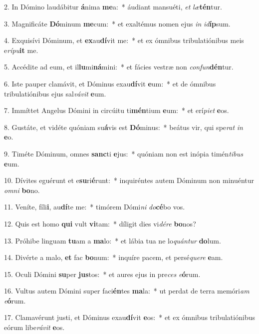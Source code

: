 2. In Dómino laudábitur \textbf{á}nima \textbf{me}a:~*  áudiant mansuéti, \textit{et} \textit{læ}\textbf{tén}tur.\

3. Magnificáte \textbf{Dó}minum \textbf{me}cum:~*  et exaltémus nomen ejus \textit{in} \textit{id}\textbf{íp}sum.\

4. Exquisívi Dóminum, et \textbf{ex}au\textbf{dí}vit me:~*  et ex ómnibus tribulatiónibus meis e\textit{rí}\textit{pu}\textbf{it} me.\

5. Accédite ad eum, et il\textbf{lu}mi\textbf{ná}mini:~*  et fácies vestræ non \textit{con}\textit{fun}\textbf{dén}tur.\

6. Iste pauper clamávit, et Dóminus exau\textbf{dí}vit \textbf{e}um:~*  et de ómnibus tribulatiónibus ejus sal\textit{vá}\textit{vit} \textbf{e}um.\

7. Immíttet Angelus Dómini in circúitu ti\textbf{mén}tium \textbf{e}um:~*  et erí\textit{pi}\textit{et} \textbf{e}os.\

8. Gustáte, et vidéte quóniam su\textbf{á}vis est \textbf{Dó}minus:~*  beátus vir, qui spe\textit{rat} \textit{in} \textbf{e}o.\

9. Timéte Dóminum, omnes \textbf{sanc}ti \textbf{e}jus:~*  quóniam non est inópia timén\textit{ti}\textit{bus} \textbf{e}um.\

10. Dívites eguérunt et e\textbf{su}ri\textbf{é}runt:~*  inquiréntes autem Dóminum non minuéntur \textit{om}\textit{ni} \textbf{bo}no.\

11. Veníte, fíli\textbf{i}, au\textbf{dí}te me:~*  timórem Dómi\textit{ni} \textit{do}\textbf{cé}bo vos.\

12. Quis est homo \textbf{qui} vult \textbf{vi}tam:~*  díligit dies vi\textit{dé}\textit{re} \textbf{bo}nos?\

13. Próhibe linguam \textbf{tu}am a \textbf{ma}lo:~*  et lábia tua ne lo\textit{quán}\textit{tur} \textbf{do}lum.\

14. Divérte a malo, \textbf{et} fac \textbf{bo}num:~*  inquíre pacem, et persé\textit{que}\textit{re} \textbf{e}am.\

15. Oculi Dómini \textbf{su}per \textbf{jus}tos:~*  et aures ejus in pre\textit{ces} \textit{e}\textbf{ó}rum.\

16. Vultus autem Dómini super faci\textbf{én}tes \textbf{ma}la:~*  ut perdat de terra memóri\textit{am} \textit{e}\textbf{ó}rum.\

17. Clamavérunt justi, et Dóminus exau\textbf{dí}vit \textbf{e}os:~*  et ex ómnibus tribulatiónibus eórum libe\textit{rá}\textit{vit} \textbf{e}os.\

